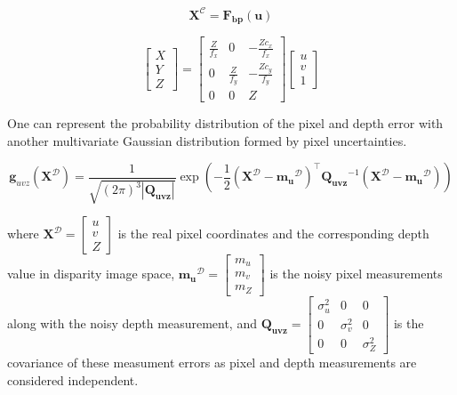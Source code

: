 \documentclass[12pt]{report}
\numberwithin{figure}{section}
\begin{document}
\begin{equation} \mathbf{X}^{\mathcal{C}} = \mathbf{F_{bp}}(\mathbf{u})
\end{equation}

\begin{equation} \begin{bmatrix} X \\ Y \\ Z \end{bmatrix} = \begin{bmatrix}
\frac{Z}{f_x} & 0 & -\frac{Z c_x}{f_x} \\ 0 & \frac{Z}{f_y} & -\frac{Z
c_y}{f_y} \\ 0 & 0 & Z \end{bmatrix} \begin{bmatrix} u \\ v \\ 1 \end{bmatrix}
\end{equation}

One can represent the probability distribution of the pixel and depth error
with another multivariate Gaussian distribution formed by pixel uncertainties. 

\begin{equation} \mathbf{g}_{uvz}(\mathbf{X}^{\mathcal{D}}) =
\frac{1}{\sqrt{(2\pi)^3|\mathbf{Q_{uvz}}|}} \exp(-\frac{1}{2}
(\mathbf{X}^{\mathcal{D}}-\mathbf{m_u}^{\mathcal{D}})^\top
\mathbf{Q_{uvz}}^{-1} (\mathbf{X}^{\mathcal{D}}-\mathbf{m_u}^{\mathcal{D}}))
\end{equation} \label{eq:cov_ellipse}

where $\mathbf{X}^{\mathcal{D}} = \begin{bmatrix} u \\ v \\ Z\end{bmatrix}$ is
the real pixel coordinates and the corresponding depth value in disparity image
space, $\mathbf{m_u}^{\mathcal{D}} = \begin{bmatrix} m_u \\ m_v \\ m_Z
\end{bmatrix}$ is the noisy pixel measurements along with the noisy depth
measurement, and $\mathbf{Q_{uvz}} = \begin{bmatrix} \sigma_u^2 & 0 & 0\\ 0 &
\sigma_v^2 & 0 \\ 0 & 0 & \sigma_Z^2\end{bmatrix}$ is the covariance of these
measument errors as pixel and depth measurements are considered independent.
\end{document}
